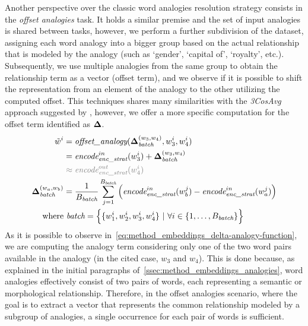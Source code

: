 Another perspective over the classic word analogies resolution strategy consists in the \emph{offset analogies} task.
It holds a similar premise and the set of input analogies is shared between tasks, however, we perform a further subdivision of the dataset, assigning each word analogy into a bigger group based on the actual relationship that is modeled by the analogy (such as `gender', `capital of', `royalty', etc.).
Subsequently, we use multiple analogies from the same group to obtain the relationship term as a vector (offset term), and we observe if it is possible to shift the representation from an element of the analogy to the other utilizing the computed offset.
This techniques shares many similarities with the \emph{3CosAvg} approach suggested by \citet{drozd2016}, however, we offer a more specific computation for the offset term identified as $\bm{\mathbf{\Delta}}$.
\begin{equation}
    \label{eq:method_embeddings_delta-analogy-function}
    \begin{aligned}
        \tilde{w}^i &= \textit{offset\_analogy}(\gbm{\Delta}_{\textit{batch}}^{(w_3, w_4)}, w_3^i, w_4^i) \\
        &= {\textit{encode}}_{\textit{enc\_strat}}^{in}(w_3^i) + \gbm{\Delta}_{\textit{batch}}^{(w_3, w_4)} \\
        &\color{gray} \approx {\textit{encode}}_{\textit{enc\_strat}}^{out}(w_4^i) \\
        \gbm{\Delta}_{\textit{batch}}^{(w_a, w_b)} &= \frac{1}{B_{\textit{batch}}}\sum_{j=1}^{B_{\textit{batch}}}{\Bigl({\textit{encode}}_{\textit{enc\_strat}}^{in}(w_b^j) - {\textit{encode}}_{\textit{enc\_strat}}^{in}(w_a^j)\Bigr)} \\
        \text{where}&\ \textit{batch} = \Bigl\{ \{w_1^i, w_2^i, w_3^i, w_4^i\} \ |\ \forall i \in \{1,\ldots, B_{\textit{batch}}\} \Bigr\}
    \end{aligned}
\end{equation}
As it is possible to observe in~\cref{eq:method_embeddings_delta-analogy-function}, we are computing the analogy term considering only one of the two word pairs available in the analogy (in the cited case, $w_3$ and $w_4$).
This is done because, as explained in the initial paragraphs of~\cref{ssec:method_embeddings_analogies}, word analogies effectively consist of two pairs of words, each representing a semantic or morphological relationship.
Therefore, in the offset analogies scenario, where the goal is to extract a vector that represents the common relationship modeled by a subgroup of analogies, a single occurrence for each pair of words is sufficient.

